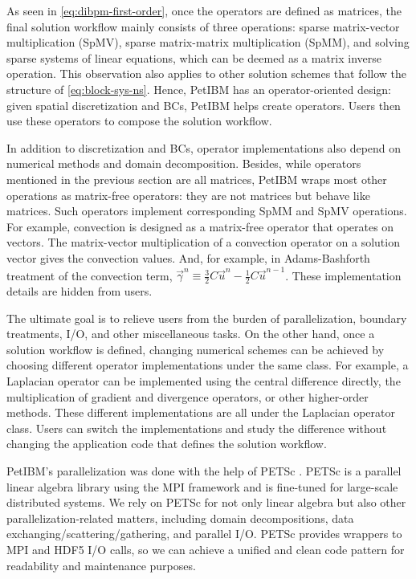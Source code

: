 

As seen in \eqref{eq:dibpm-first-order}, once the operators are defined as matrices, the final solution workflow mainly consists of three operations: sparse matrix-vector multiplication (SpMV), sparse matrix-matrix multiplication (SpMM), and solving sparse systems of linear equations, which can be deemed as a matrix inverse operation.
This observation also applies to other solution schemes that follow the structure of \eqref{eq:block-sys-ns}.
Hence, PetIBM has an operator-oriented design: given spatial discretization and BCs, PetIBM helps create operators.
Users then use these operators to compose the solution workflow.

In addition to discretization and BCs, operator implementations also depend on numerical methods and domain decomposition.
Besides, while operators mentioned in the previous section are all matrices, PetIBM wraps most other operations as matrix-free operators: they are not matrices but behave like matrices.
Such operators implement corresponding SpMM and SpMV operations.
For example, convection is designed as a matrix-free operator that operates on vectors.
The matrix-vector multiplication of a convection operator on a solution vector gives the convection values. 
And, for example, in Adams-Bashforth treatment of the convection term, $\vec{\gamma}^n \equiv \frac{3}{2}C\vec{u}^{n} - \frac{1}{2}C\vec{u}^{n-1}$.
These implementation details are hidden from users.

The ultimate goal is to relieve users from the burden of parallelization, boundary treatments, I/O, and other miscellaneous tasks.
On the other hand, once a solution workflow is defined, changing numerical schemes can be achieved by choosing different operator implementations under the same class.
For example, a Laplacian operator can be implemented using the central difference directly, the multiplication of gradient and divergence operators, or other higher-order methods.
These different implementations are all under the Laplacian operator class.
Users can switch the implementations and study the difference without changing the application code that defines the solution workflow.

PetIBM's parallelization was done with the help of PETSc \cite{balay_petsc_2017}.
PETSc is a parallel linear algebra library using the MPI framework and is fine-tuned for large-scale distributed systems.
We rely on PETSc for not only linear algebra but also other parallelization-related matters, including domain decompositions, data exchanging/scattering/gathering, and parallel I/O.
PETSc provides wrappers to MPI and HDF5 I/O calls, so we can achieve a unified and clean code pattern for readability and maintenance purposes.

